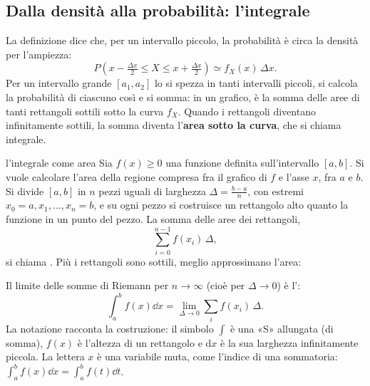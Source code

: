\subsection{Dalla densità alla probabilità: l'integrale}

La definizione dice che, per un intervallo piccolo, la probabilità è circa la densità per l'ampiezza:
\[ P\left( x - \tfrac{\Delta x}{2} \leq X \leq x + \tfrac{\Delta x}{2} \right) \simeq f_X(x)\, \Delta x . \]
Per un intervallo grande $[a_1, a_2]$ lo si spezza in tanti intervalli piccoli, si calcola la probabilità di ciascuno
così e si somma: in un grafico, è la somma delle aree di tanti rettangoli sottili sotto la curva $f_X$. Quando i
rettangoli diventano infinitamente sottili, la somma diventa l'\textbf{area sotto la curva}, che si chiama integrale.

\begin{richiamo}{l'integrale come area}
Sia $f(x) \geq 0$ una funzione definita sull'intervallo $[a, b]$. Si vuole calcolare l'area della regione compresa fra
il grafico di $f$ e l'asse $x$, fra $a$ e $b$. Si divide $[a, b]$ in $n$ pezzi uguali di larghezza
$\Delta = \frac{b-a}{n}$, con estremi $x_0 = a, x_1, \ldots, x_n = b$, e su ogni pezzo si costruisce un rettangolo alto
quanto la funzione in un punto del pezzo. La somma delle aree dei rettangoli,
\[ \sum_{i=0}^{n-1} f(x_i)\, \Delta , \]
si chiama . Più i rettangoli sono sottili, meglio approssimano l'area:
\begin{center}
\end{center}
Il limite delle somme di Riemann per $n \to \infty$ (cioè per $\Delta \to 0$) è l':
\[ \int_a^b f(x) \dd x = \lim_{\Delta \to 0} \sum_{i} f(x_i)\, \Delta . \]
La notazione racconta la costruzione: il simbolo $\int$ è una «S» allungata (di somma), $f(x)$ è l'altezza di un
rettangolo e $\mathrm{d}x$ è la sua larghezza infinitamente piccola. La lettera $x$ è una variabile muta, come l'indice
di una sommatoria: $\int_a^b f(x) \dd x = \int_a^b f(t) \dd t$.


\end{richiamo}
